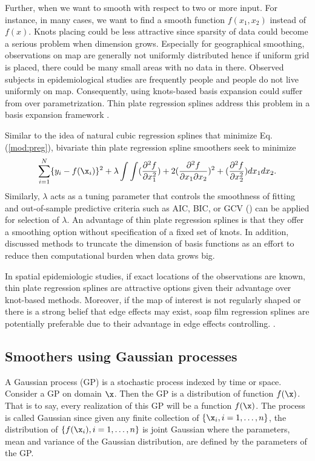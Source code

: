 Further, when we want to smooth with respect to two or more input. For instance, in many cases, we want to find a smooth function $f(x_1,x_2)$ instead of $f(x)$. Knots placing could be less attractive since sparsity of data could become a serious problem when dimension grows. Especially for geographical smoothing, observations on map are generally not uniformly distributed hence if uniform grid is placed, there could be many small areas with no data in there. Observed subjects in epidemiological studies are frequently people and people do not live uniformly on map. Consequently, using knots-based basis expansion could suffer from over parametrization. Thin plate regression splines address this problem in a basis expansion framework \citep{wood2003thin}.   

Similar to the idea of natural cubic regression splines that minimize Eq. (\ref{mod:preg}), bivariate thin plate regression spline smoothers seek to minimize
\begin{equation} \label{eq:tps}
\sum_{i=1}^{N}\{y_i-f(\x_i)\}^2
+\lambda\int\int (\frac{\partial^2f}{\partial x_1^2})
+2(\frac{\partial^2f}{\partial x_1 \partial x_2})^2
+(\frac{\partial^2f}{\partial x_2^2})dx_1dx_2.
\end{equation}
Similarly, $\lambda$ acts as a tuning parameter that controls the smoothness of fitting and out-of-sample predictive criteria such as AIC, BIC, or GCV (\cite{golub1979generalized}) can be applied for selection of $\lambda$. An advantage of thin plate regression splines is that they offer a smoothing option without specification of a fixed set of knots. In addition, \citet[Chapter 5.5.1]{wood2017generalized} discussed methods to truncate the dimension of basis functions as an effort to reduce then computational burden when data grows big. 

In spatial epidemiologic studies, if exact locations of the observations are known, thin plate regression splines are attractive options given their advantage over knot-based methods. Moreover, if the map of interest is not regularly shaped or there is a strong belief that edge effects may exist, soap film regression splines are potentially preferable due to their advantage in edge effects controlling. \citep{wood2008soap}.

\subsection{Smoothers using Gaussian processes}

A Gaussian process (GP) is a stochastic process indexed by time or space. Consider a GP on domain $\x$. Then the GP is a distribution of function $f(\x)$. That is to say, every realization of this GP will be a function $f(\x)$. The process is called Gaussian since given any finite collection of $\{\x_i,i=1,\dots,n\}$, the distribution of $\{f(\x_i),i=1,\dots,n\}$ is joint Gaussian where the parameters, mean and variance of the Gaussian distribution, are defined by the parameters of the GP. 

